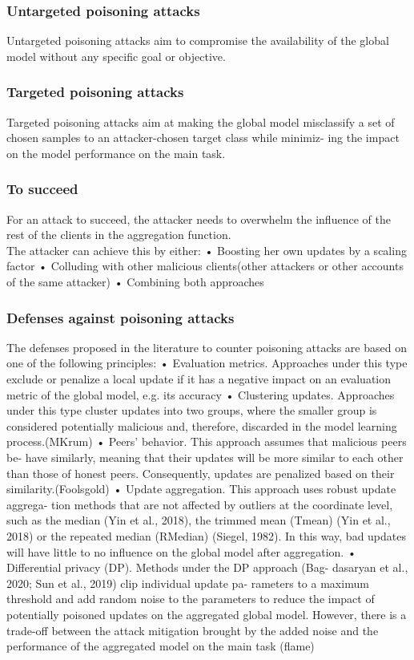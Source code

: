 \subsubsection{Untargeted poisoning attacks}
Untargeted poisoning attacks aim to compromise the availability of the global 
model without any specific goal or objective.

\subsubsection{Targeted poisoning attacks}
Targeted poisoning attacks aim at making the global model misclassify a set 
of chosen samples to an attacker-chosen target class while minimiz- ing the 
impact on the model performance on the main task.


\subsubsection{To succeed}
For an attack to succeed, the attacker needs to overwhelm the influence of the rest of the clients in the aggregation function.\\
The attacker can achieve this by either:
• Boosting her own updates by a scaling factor
• Colluding with other malicious clients(other attackers or other accounts of the same attacker)
• Combining both approaches\\






\subsubsection{Defenses against poisoning attacks}
The defenses proposed in the literature to counter poisoning attacks are based on one of the following principles:
• Evaluation metrics. Approaches under this type exclude or penalize a local update if it has a negative impact on an evaluation metric of the global model, e.g. its accuracy
• Clustering updates. Approaches under this type cluster updates into two groups, where the smaller group is considered potentially malicious and, therefore, discarded in the model learning process.(MKrum)
• Peers’ behavior. This approach assumes that malicious peers be- have similarly, meaning that their updates will be more similar to each other than those of honest peers. Consequently, updates are penalized based on their similarity.(Foolsgold)
• Update aggregation. This approach uses robust update aggrega- tion methods that are not affected by outliers at the coordinate level, such as the median (Yin et al., 2018), the trimmed mean (Tmean) (Yin et al., 2018) or the repeated median (RMedian) (Siegel, 1982). In this way, bad updates will have little to no influence on the global model after aggregation.
• Differential privacy (DP). Methods under the DP approach (Bag- dasaryan et al., 2020; Sun et al., 2019) clip individual update pa- rameters to a maximum threshold and add random noise to the parameters to reduce the impact of potentially poisoned updates on the aggregated global model. However, there is a trade-off between the attack mitigation brought by the added noise and the performance of the aggregated model on the main task (flame)

